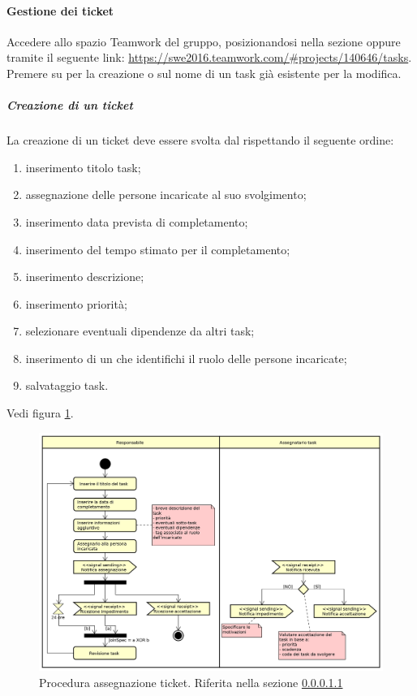             \paragraph{Gestione dei ticket}\label{sec:procTicket}
            Accedere allo spazio Teamwork del gruppo, posizionandosi nella sezione  oppure tramite il seguente link: \url{https://swe2016.teamwork.com/#projects/140646/tasks}. Premere su  per la creazione o sul nome di un task già esistente per la modifica.
	            \subparagraph{Creazione di un ticket}\label{sec:creazioneticket}
	                La creazione di un ticket deve essere svolta dal \responsabilediprogetto{} rispettando il seguente ordine:
	                \begin{enumerate}
	                	\item inserimento titolo task;
	                	\item assegnazione delle persone incaricate al suo svolgimento;
	                	\item inserimento data prevista di completamento;
	                	\item inserimento del tempo stimato per il completamento;
	                	\item inserimento descrizione;
	                	\item inserimento priorità;
	                	\item selezionare eventuali dipendenze da altri task;
	                	\item inserimento di un  che identifichi il ruolo delle persone incaricate;
	                	\item salvataggio task.
	                \end{enumerate}
	                Vedi figura \ref{fig:procassticket}.
	    	        \begin{figure}[h!]
	    		        \includegraphics[width=\textwidth]{img/proc_ass_ticket.png}
	    		        \caption{Procedura assegnazione ticket. Riferita nella sezione \ref{sec:creazioneticket}}
	                    \label{fig:procassticket}
	    	        \end{figure}\mbox{}\\
